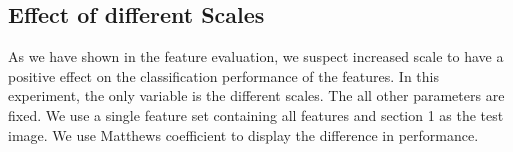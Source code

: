 \subsection{Effect of different Scales}

As we have shown in the feature evaluation, we suspect increased scale to have a positive effect on the classification performance of the features. In this experiment, the only variable is the different scales. The all other parameters are fixed. We use a single feature set containing all features and section 1 as the test image. We use Matthews coefficient to display the difference in performance.

%
%	


